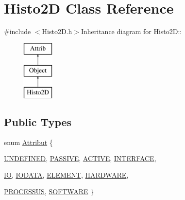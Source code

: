 \hypertarget{classHisto2D}{
\section{Histo2D Class Reference}
\label{classHisto2D}
}


{\ttfamily \#include $<$Histo2D.h$>$}Inheritance diagram for Histo2D::\begin{figure}[H]
\begin{center}
\leavevmode
\includegraphics[height=3cm]{classHisto2D}
\end{center}
\end{figure}
\subsection*{Public Types}
\begin{DoxyCompactItemize}
\item 
enum \hyperlink{classAttrib_a69e171d7cc6417835a5a306d3c764235}{Attribut} \{ \par
\hyperlink{classAttrib_a69e171d7cc6417835a5a306d3c764235a3a8da2ab97dda18aebab196fe4100531}{UNDEFINED}, 
\hyperlink{classAttrib_a69e171d7cc6417835a5a306d3c764235a2bfb2af57b87031d190a05fe25dd92ed}{PASSIVE}, 
\hyperlink{classAttrib_a69e171d7cc6417835a5a306d3c764235a3b1fec929c0370d1436f2f06e298fb0d}{ACTIVE}, 
\hyperlink{classAttrib_a69e171d7cc6417835a5a306d3c764235aa27c16b480a369ea4d18b07b2516bbc7}{INTERFACE}, 
\par
\hyperlink{classAttrib_a69e171d7cc6417835a5a306d3c764235a1420a5b8c0540b2af210b6975eded7f9}{IO}, 
\hyperlink{classAttrib_a69e171d7cc6417835a5a306d3c764235a0af3b0d0ac323c1704e6c69cf90add28}{IODATA}, 
\hyperlink{classAttrib_a69e171d7cc6417835a5a306d3c764235a7788bc5dd333fd8ce18562b269c9dab1}{ELEMENT}, 
\hyperlink{classAttrib_a69e171d7cc6417835a5a306d3c764235a61ceb22149f365f1780d18f9d1459423}{HARDWARE}, 
\par
\hyperlink{classAttrib_a69e171d7cc6417835a5a306d3c764235a75250e29692496e73effca2c0330977f}{PROCESSUS}, 
\hyperlink{classAttrib_a69e171d7cc6417835a5a306d3c764235a103a67cd0b8f07ef478fa45d4356e27b}{SOFTWARE}
 \}
\end{DoxyCompactItemize}
